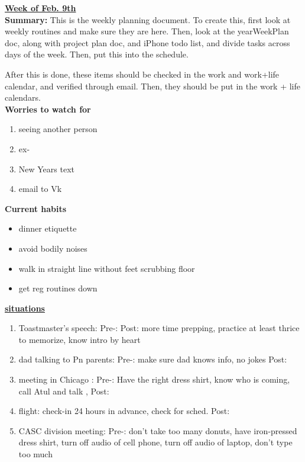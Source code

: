 \documentclass[11pt]{article}
\begin{document}
{\huge{\underline{\textbf{Week of Feb. 9th}}}} \\

\textbf{Summary:} This is the weekly planning document. To create
this, first look at weekly routines and make sure they are here. Then,
look at the yearWeekPlan doc, along with project plan doc, and iPhone
todo list, and divide tasks across days of the week. Then, put this
into the schedule.

After this is done, these items should be checked in the work and
work+life calendar, and verified through email.
Then, they should be put in the work + life
calendars. \\

\textbf{Worries to watch for} \\
\begin{enumerate}
\item seeing another person
\item ex-
\item New Years text
\item email to Vk
\end{enumerate}

\textbf{Current habits}\\
\begin{itemize}
\item dinner etiquette
\item avoid bodily noises
\item walk in straight line without feet scrubbing floor
\item get reg routines down
\end{itemize}

\underline{\textbf{situations}} \\
\begin{enumerate}
\item Toastmaster's speech:  Pre-:  Post: more time prepping, practice at least thrice to memorize,  know intro by heart
\item dad talking to Pn parents: Pre-: make sure dad knows info, no jokes Post:
\item meeting in Chicago : Pre-: Have the right dress shirt, know who is coming, call Atul and talk ,  Post:
\item flight: check-in 24 hours in advance, check for sched. Post:
\item CASC division meeting: Pre-:  don't take too many donuts, have iron-pressed dress shirt, turn off audio of cell phone, turn off audio of laptop, don't type too much
\end{enumerate}
\end{document}
